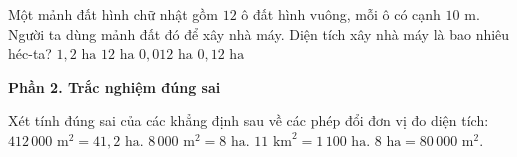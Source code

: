 \begin{ex} %
Một mảnh đất hình chữ nhật gồm $12$ ô đất hình vuông, mỗi ô có cạnh $10\text{ m}$. Người ta dùng mảnh đất đó để xây nhà máy. Diện tích xây nhà máy là bao nhiêu héc-ta?
\choice
{$1{,}2\text{ ha}$}
{$12\text{ ha}$}
{$0{,}012\text{ ha}$}
{\True $0{,}12\text{ ha}$}
\end{ex}

\textbf{Phần 2. Trắc nghiệm đúng sai}

\begin{ex} %
Xét tính đúng sai của các khẳng định sau về các phép đổi đơn vị đo diện tích:
\choiceTF
{\True $412\,000\text{ m}^2 = 41{,}2\text{ ha}$.}
{$8\,000\text{ m}^2 = 8\text{ ha}$.}
{\True $11\text{ km}^2 = 1\,100\text{ ha}$.}
{\True $8\text{ ha} = 80\,000\text{ m}^2$.}
\end{ex}

